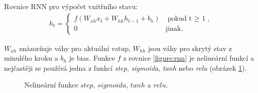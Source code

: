 Rovnice RNN pro výpočet vnitřního stavu:
\begin{align}\label{figure:rnn}
  h_t = \begin{cases}
          f(W_{xh}x_t + W_{hh}h_{t-1} + b_h) & \mbox{pokud t $\geq$ 1}, \\
          0 & \mbox{jinak}.
        \end{cases}
\end{align}


$W_{xh}$ znázorňuje váhy pro aktuální vstup, $W_{hh}$ jsou váhy pro skrytý stav z minulého kroku a $b_h$ je bias. Funkce $f$ z rovnice \ref{figure:rnn} je nelineární funkcí a nejčastěji se používá jedna z funkcí \emph{step}, \emph{sigmoida}, \emph{tanh} nebo \emph{relu} (obrázek \ref{img:functions}).

\begin{figure}[H]
    \begin{center}
    \end{center}
	\caption{Nelineární funkce $step$, $sigmoida$, $tanh$ a $relu$.}
	\label{img:functions}
\end{figure}

